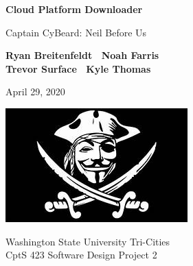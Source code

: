 \documentclass{article}
\begin{document}

    \begin{titlepage}
        \begin{center}
            \vspace*{1cm}
    
            \Huge
            \textbf{Cloud Platform Downloader}
    
            \vspace{.5cm}
            \LARGE
            Captain CyBeard: Neil Before Us
    
            \vspace{1cm}
    
            \textbf{Ryan Breitenfeldt \textbar\ Noah Farris\\ Trevor Surface \textbar\ Kyle Thomas}
    
            \vspace{.2cm}
            \Large
            April 29, 2020
    
            \vspace{2cm}
            \includegraphics[scale=1]{logo}
    
            \vfill
    
            Washington State University Tri-Cities\\
            CptS 423 Software Design Project 2
    
        \end{center}
    \end{titlepage}
\end{document}
